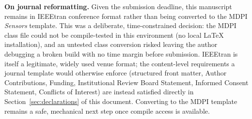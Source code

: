 \documentclass[conference]{IEEEtran}
\begin{document}
\textbf{On journal reformatting.} Given the submission deadline,
this manuscript remains in IEEEtran conference format rather than
being converted to the MDPI \textit{Sensors} template. This was a
deliberate, time-constrained decision: the MDPI class file could
not be compile-tested in this environment (no local LaTeX
installation), and an untested class conversion risked leaving the
author debugging a broken build with no time margin before
submission. IEEEtran is itself a legitimate, widely used venue
format; the content-level requirements a journal template would
otherwise enforce (structured front matter, Author Contributions,
Funding, Institutional Review Board Statement, Informed Consent
Statement, Conflicts of Interest) are instead satisfied directly in
Section~\ref{sec:declarations} of this document. Converting to the
MDPI template remains a safe, mechanical next step once compile
access is available.
\end{document}
